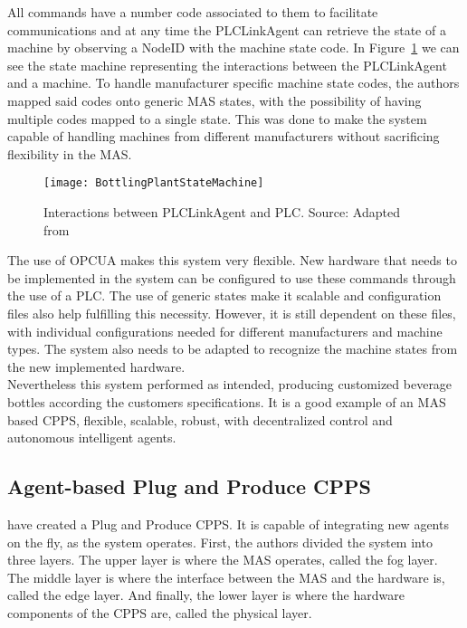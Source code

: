 All commands have a number code associated to them to facilitate communications and at any time the PLCLinkAgent can retrieve the state of a machine by observing a NodeID with the machine state code. In Figure~\ref{fig:bottling_plant_state_achine} we can see the state machine representing the interactions between the PLCLinkAgent and a machine. To handle manufacturer specific machine state codes, the authors mapped said codes onto generic \acrshort{MAS} states, with the possibility of having multiple codes mapped to a single state. This was done to make the system capable of handling machines from different manufacturers without sacrificing flexibility in the \acrshort{MAS}.

\begin{figure}[h!]
	\centering
	\texttt{[image: BottlingPlantStateMachine]}
	\caption{Interactions between PLCLinkAgent and \acrshort{PLC}. Source: Adapted from \cite{bottling_plant_part2}}
	\label{fig:bottling_plant_state_achine}
\end{figure}

The use of \acrshort{OPCUA} makes this system very flexible. New hardware that needs to be implemented in the system can be configured to use these commands through the use of a \acrshort{PLC}. The use of generic states make it scalable and configuration files also help fulfilling this necessity. However, it is still dependent on these files, with individual configurations needed for different manufacturers and machine types. The system also needs to be adapted to recognize the machine states from the new implemented hardware.\\

Nevertheless this system performed as intended, producing customized beverage bottles according the customers specifications. It is a good example of an \acrshort{MAS} based \acrshort{CPPS}, flexible, scalable, robust, with decentralized control and autonomous intelligent agents.
 
\subsection{Agent-based Plug and Produce CPPS}
\label{agent_plug_and_produce}

\citeauthor{8972169} \cite{8972169} have created a Plug and Produce \acrshort{CPPS}. It is capable of integrating new agents on the fly, as the system operates. First, the authors divided the system into three layers. The upper layer is where the \acrshort{MAS} operates, called the fog layer. The middle layer is where the interface between the \acrshort{MAS} and the hardware is, called the edge layer. And finally, the lower layer is where the hardware components of the \acrshort{CPPS} are, called the physical layer.\\

